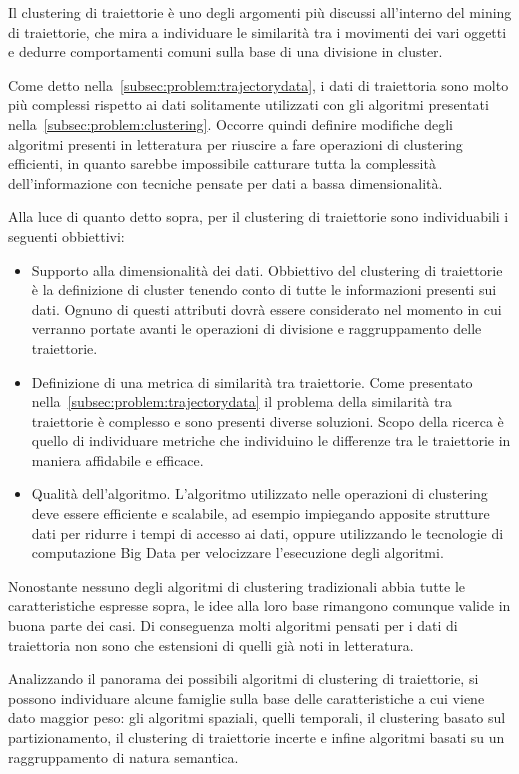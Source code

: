 Il clustering di traiettorie è uno degli argomenti più discussi all'interno del mining di traiettorie, che mira
a individuare le similarità tra i movimenti dei vari oggetti e dedurre comportamenti comuni sulla
base di una divisione in cluster.

Come detto nella~\cref*{subsec:problem:trajectorydata}, i dati di traiettoria sono molto più complessi
rispetto ai dati solitamente utilizzati con gli algoritmi presentati nella~\cref*{subsec:problem:clustering}.
Occorre quindi definire modifiche degli algoritmi presenti in letteratura per riuscire a fare operazioni di clustering
efficienti, in quanto sarebbe impossibile catturare tutta la complessità dell'informazione con
tecniche pensate per dati a bassa dimensionalità.

Alla luce di quanto detto sopra, per il clustering di traiettorie sono individuabili i seguenti obbiettivi:

\begin{itemize}

  \item Supporto alla dimensionalità dei dati.
  Obbiettivo del clustering di traiettorie è la definizione di cluster tenendo conto di tutte le informazioni presenti sui dati.
  Ognuno di questi attributi dovrà essere considerato nel momento in cui verranno portate avanti le operazioni di divisione e raggruppamento delle traiettorie.

  \item Definizione di una metrica di similarità tra traiettorie.
  Come presentato nella~\cref{subsec:problem:trajectorydata} il problema della similarità tra traiettorie è complesso e sono presenti diverse soluzioni.
  Scopo della ricerca è quello di individuare metriche che individuino le differenze tra le traiettorie in maniera affidabile e efficace.

  \item Qualità dell'algoritmo.
  L'algoritmo utilizzato nelle operazioni di clustering deve essere efficiente e scalabile, ad esempio impiegando apposite strutture dati per
  ridurre i tempi di accesso ai dati, oppure utilizzando le tecnologie di computazione Big Data per velocizzare l'esecuzione degli algoritmi.

\end{itemize}

Nonostante nessuno degli algoritmi di clustering tradizionali abbia tutte le caratteristiche espresse sopra, le idee alla loro base rimangono comunque
valide in buona parte dei casi.
Di conseguenza molti algoritmi pensati per i dati di traiettoria non sono che estensioni di quelli già noti in letteratura.

Analizzando il panorama dei possibili algoritmi di clustering di traiettorie, si possono individuare alcune famiglie sulla base delle caratteristiche a cui
viene dato maggior peso: gli algoritmi spaziali, quelli temporali, il clustering basato sul partizionamento, il clustering di traiettorie incerte e infine algoritmi
basati su un raggruppamento di natura semantica.
